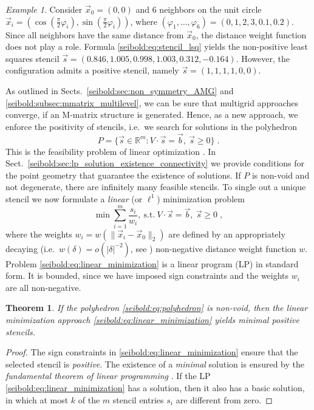 \documentclass[reqno]{amsart}
\theoremstyle{plain}
\newtheorem{thm}{Theorem}
\theoremstyle{definition}
\theoremstyle{remark}
\newtheorem{ex}{Example}
\begin{document}
\begin{ex}
\label{seibold:ex:qm_nonpos_stencil}
Consider $\vec{x}_0=(0,0)$ and 6 neighbors on the unit
circle $\vec{x}_i=(\cos(\frac{\pi}{2}\varphi_i),\sin(\frac{\pi}{2}\varphi_i))$,
where $(\varphi_1,\dots,\varphi_6)=(0,1,2,3,0.1,0.2)$.
Since all neighbors have the same distance from $\vec{x}_0$, the distance weight
function does not play a role. Formula \eqref{seibold:eq:stencil_lsq} yields the
non-positive least squares stencil $\vec{s}=(0.846,1.005,0.998,1.003,0.312,-0.164)$.
However, the configuration admits a positive stencil, namely $\vec{s}=(1,1,1,1,0,0)$.
\end{ex}
As outlined in Sects.~\ref{seibold:sec:non_symmetry_AMG}
and \ref{seibold:subsec:mmatrix_multilevel}, we can be sure that multigrid
approaches converge, if an M-matrix structure is generated. Hence, as a new approach,
we enforce the positivity of stencils, i.e.~we search for solutions in the polyhedron
\begin{equation}
P = \{\vec{s}\in\mathbb{R}^m : V\cdot\vec{s} = \vec{b} , \
\vec{s}\ge 0\}\;.
\label{seibold:eq:polyhedron}
\end{equation}
This is the feasibility problem of linear optimization \cite{Vanderbei2001}.
In Sect.~\ref{seibold:sec:lp_solution_existence_connectivity} we provide conditions for
the point geometry that guarantee the existence of solutions.
If $P$ is non-void and not degenerate, there are infinitely many feasible stencils.
To single out a unique stencil we now formulate a \emph{linear} (or $\ell^1$)
minimization problem
\begin{equation}
\min \sum_{i=1}^m \frac{s_i}{w_i}, \ \mathrm{s.t.} \
V\cdot\vec{s}=\vec{b}, \ \vec{s}\ge 0\;,
\label{seibold:eq:linear_minimization}
\end{equation}
where the weights $w_i=w(\|\vec{x}_i-\vec{x}_0\|_2)$ are defined by an appropriately
decaying (i.e.~$w(\delta) = o(|\delta|^{-2})$, see \cite{Seibold2008})
non-negative distance weight function $w$.
Problem \eqref{seibold:eq:linear_minimization} is a linear program (LP) in standard
form. It is bounded, since we have imposed sign constraints and the weights $w_i$
are all non-negative.
\begin{thm}
If the polyhedron \eqref{seibold:eq:polyhedron} is non-void, then the linear
minimization approach \eqref{seibold:eq:linear_minimization} yields minimal positive
stencils.
\end{thm}
\begin{proof}
The sign constraints in \eqref{seibold:eq:linear_minimization} ensure that the selected
stencil is \emph{positive}. The existence of a \emph{minimal} solution is ensured by
the \emph{fundamental theorem of linear programming} \cite{Vanderbei2001}.
If the LP \eqref{seibold:eq:linear_minimization} has a solution, then it also has a
basic solution, in which at most $k$ of the $m$ stencil entries $s_i$ are different
from zero.
\end{proof}
\end{document}
